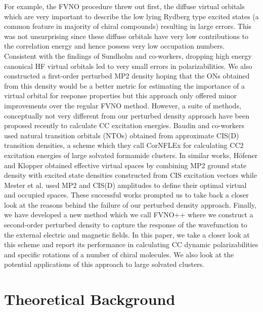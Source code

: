 For example, the FVNO procedure threw out first, the diffuse virtual 
orbitals which are very important to describe the low lying Rydberg type 
excited states (a common feature in majority of chiral compounds) 
resulting in large errors. This was not unsurprising since these diffuse 
orbitals have very low contributions to the correlation energy and hence 
possess very low occupation numbers. Consistent with the findings of Sundholm 
and co-workers\cite{Sundholm13}, dropping high energy canonical HF 
virtual orbitals led to very small errors in polarizabilities. 
We also constructed a first-order perturbed MP2 density hoping that 
the ONs obtained from this density would be a better metric for 
estimating the importance of a virtual orbital 
for response properties but this approach only offered
minor improvements over the regular FVNO method. However, 
a suite of methods, conceptually not very different from our 
perturbed density approach have been proposed recently 
to calculate CC excitation energies. Baudin and co-workers 
used natural transition orbitals (NTOs) obtained from approximate 
CIS(D) transition densities, a scheme which they call CorNFLEx for 
calculating CC2 excitation energies of large solvated formamide 
clusters\cite{}. In similar works, H{\"o}fener and Klopper 
obtained effective virtual spaces by combining MP2 
ground state density with excited state densities constructed from CIS 
excitation vectors\cite{} while Mester et al. used MP2 and CIS(D) amplitudes 
to define their optimal virtual and occupied spaces\cite{Mester17,Mester18}.
These successful works prompted us to take back a closer look at the 
reasons behind the failure of our perturbed density approach. 
Finally, we have developed a new method which we call FVNO++ 
where we construct a second-order perturbed density to 
capture the response of the wavefunction to the external electric 
and magnetic fields. In this paper, we take a closer look at this 
scheme and report its performance in calculating CC dynamic 
polarizabilities and specific rotations of a number of chiral molecules.
We also look at the potential applications of this approach to large
solvated clusters.
\section{Theoretical Background}
